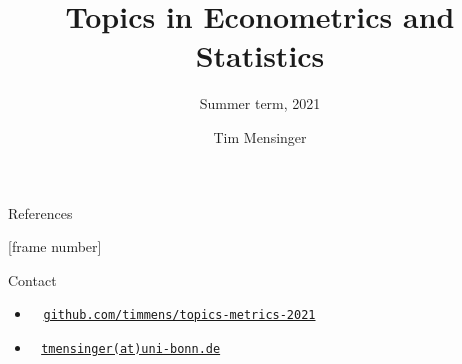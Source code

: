 \documentclass[serif, mathsansserif, aspectratio=169]{beamer}
\title{Topics in Econometrics and Statistics}
\subtitle{Summer term, 2021}
\author{Tim Mensinger}
\institute{University of Bonn}
\date{}
\begin{document}
\begin{frame}
    \maketitle
\end{frame}

\begin{frame}
  \tableofcontents
\end{frame}





\begin{frame}{References}
    \nocite{*}
    \printbibliography
\end{frame}

[frame number]{}  %
\begin{frame}{Contact}
    \begin{itemize}
        \item[] \large {} \,\,\, \texttt{\url{github.com/timmens/topics-metrics-2021}}
        \item[] \large {} \,\, \texttt{\url{tmensinger(at)uni-bonn.de}}
    \end{itemize}
\end{frame}
\end{document}
